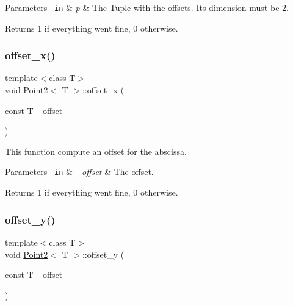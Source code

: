 \begin{DoxyParams}[1]{Parameters}
\mbox{\texttt{ in}}  & {\em p} & The {\ttfamily \mbox{\hyperlink{class_tuple}{Tuple}}} with the offsets. Its dimension must be 2. \\
\hline
\end{DoxyParams}
\begin{DoxyReturn}{Returns}
1 if everything went fine, 0 otherwise. 
\end{DoxyReturn}
\mbox{\label{class_point2_a24d1c6e9487f0baa48543b0fa1c87906}} 
\subsubsection{\texorpdfstring{offset\_x()}{offset\_x()}}
{\footnotesize\ttfamily template$<$class T$>$ \\
void \mbox{\hyperlink{class_point2}{Point2}}$<$ T $>$\+::offset\+\_\+x (\begin{DoxyParamCaption}\item[{const T}]{\+\_\+offset }\end{DoxyParamCaption})\hspace{0.3cm}{\ttfamily [inline]}}



This function compute an offset for the abscissa. 


\begin{DoxyParams}[1]{Parameters}
\mbox{\texttt{ in}}  & {\em \+\_\+offset} & The offset. \\
\hline
\end{DoxyParams}
\begin{DoxyReturn}{Returns}
1 if everything went fine, 0 otherwise. 
\end{DoxyReturn}
\mbox{\label{class_point2_a847590c808b59b824ac3c0044544ab6b}} 
\subsubsection{\texorpdfstring{offset\_y()}{offset\_y()}}
{\footnotesize\ttfamily template$<$class T$>$ \\
void \mbox{\hyperlink{class_point2}{Point2}}$<$ T $>$\+::offset\+\_\+y (\begin{DoxyParamCaption}\item[{const T}]{\+\_\+offset }\end{DoxyParamCaption})\hspace{0.3cm}{\ttfamily [inline]}}



